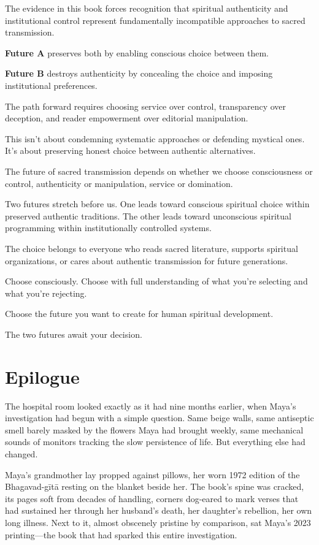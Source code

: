 \documentclass[12pt,twoside]{book}
\begin{document}
The evidence in this book forces recognition that spiritual authenticity and institutional control represent fundamentally incompatible approaches to sacred transmission.

\textbf{\textbf{Future A}} preserves both by enabling conscious choice between them.

\textbf{\textbf{Future B}} destroys authenticity by concealing the choice and imposing institutional preferences.

The path forward requires choosing service over control, transparency over deception, and reader empowerment over editorial manipulation.

This isn't about condemning systematic approaches or defending mystical ones. It's about preserving honest choice between authentic alternatives.

The future of sacred transmission depends on whether we choose consciousness or control, authenticity or manipulation, service or domination.

Two futures stretch before us. One leads toward conscious spiritual choice within preserved authentic traditions. The other leads toward unconscious spiritual programming within institutionally controlled systems.

The choice belongs to everyone who reads sacred literature, supports spiritual organizations, or cares about authentic transmission for future generations.

Choose consciously. Choose with full understanding of what you're selecting and what you're rejecting.

Choose the future you want to create for human spiritual development.

The two futures await your decision.
\part{Epilogue}
\label{sec:org5cb28a6}
\thispagestyle{chapterpage}

\normalfont\justifying

The hospital room looked exactly as it had nine months earlier, when Maya's investigation had begun with a simple question. Same beige walls, same antiseptic smell barely masked by the flowers Maya had brought weekly, same mechanical sounds of monitors tracking the slow persistence of life. But everything else had changed.

Maya's grandmother lay propped against pillows, her worn 1972 edition of the Bhagavad-gītā resting on the blanket beside her. The book's spine was cracked, its pages soft from decades of handling, corners dog-eared to mark verses that had sustained her through her husband's death, her daughter's rebellion, her own long illness. Next to it, almost obscenely pristine by comparison, sat Maya's 2023 printing—the book that had sparked this entire investigation.
\end{document}
